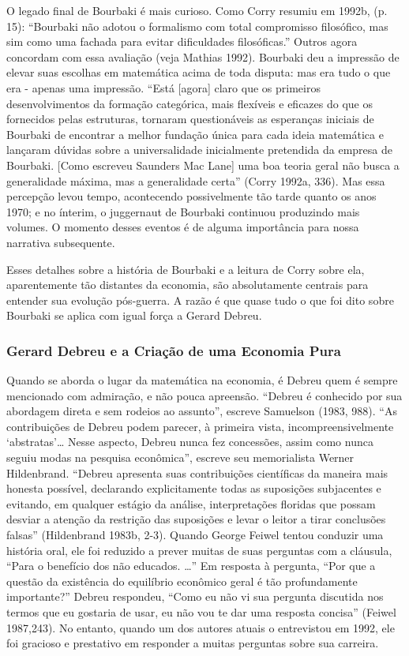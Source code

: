 \documentclass[a4paper,12pt]{article}[abntex2]
\begin{document}
O legado final de Bourbaki é mais curioso. Como Corry resumiu em 1992b, (p. 15): “Bourbaki não adotou o formalismo com total compromisso filosófico, mas sim como uma fachada para evitar dificuldades filosóficas.” Outros agora concordam com essa avaliação (veja Mathias 1992). Bourbaki deu a impressão de elevar suas escolhas em matemática acima de toda disputa: mas era tudo o que era - apenas uma impressão. “Está [agora] claro que os primeiros desenvolvimentos da formação categórica, mais flexíveis e eficazes do que os fornecidos pelas estruturas, tornaram questionáveis as esperanças iniciais de Bourbaki de encontrar a melhor fundação única para cada ideia matemática e lançaram dúvidas sobre a universalidade inicialmente pretendida da empresa de Bourbaki. [Como escreveu Saunders Mac Lane] uma boa teoria geral não busca a generalidade máxima, mas a generalidade certa” (Corry 1992a, 336). Mas essa percepção levou tempo, acontecendo possivelmente tão tarde quanto os anos 1970; e no ínterim, o juggernaut de Bourbaki continuou produzindo mais volumes. O momento desses eventos é de alguma importância para nossa narrativa subsequente.

Esses detalhes sobre a história de Bourbaki e a leitura de Corry sobre ela, aparentemente tão distantes da economia, são absolutamente centrais para entender sua evolução pós-guerra. A razão é que quase tudo o que foi dito sobre Bourbaki se aplica com igual força a Gerard Debreu.

\subsubsection{\textbf{Gerard Debreu e a Criação de uma Economia Pura}}
Quando se aborda o lugar da matemática na economia, é Debreu quem é sempre mencionado com admiração, e não pouca apreensão. “Debreu é conhecido por sua abordagem direta e sem rodeios ao assunto”, escreve Samuelson (1983, 988). “As contribuições de Debreu podem parecer, à primeira vista, incompreensivelmente ‘abstratas’… Nesse aspecto, Debreu nunca fez concessões, assim como nunca seguiu modas na pesquisa econômica”, escreve seu memorialista Werner Hildenbrand. “Debreu apresenta suas contribuições científicas da maneira mais honesta possível, declarando explicitamente todas as suposições subjacentes e evitando, em qualquer estágio da análise, interpretações floridas que possam desviar a atenção da restrição das suposições e levar o leitor a tirar conclusões falsas” (Hildenbrand 1983b, 2-3). Quando George Feiwel tentou conduzir uma história oral, ele foi reduzido a prever muitas de suas perguntas com a cláusula, “Para o benefício dos não educados. …” Em resposta à pergunta, “Por que a questão da existência do equilíbrio econômico geral é tão profundamente importante?” Debreu respondeu, “Como eu não vi sua pergunta discutida nos termos que eu gostaria de usar, eu não vou te dar uma resposta concisa” (Feiwel 1987,243). No entanto, quando um dos autores atuais o entrevistou em 1992, ele foi gracioso e prestativo em responder a muitas perguntas sobre sua carreira.
\end{document}

